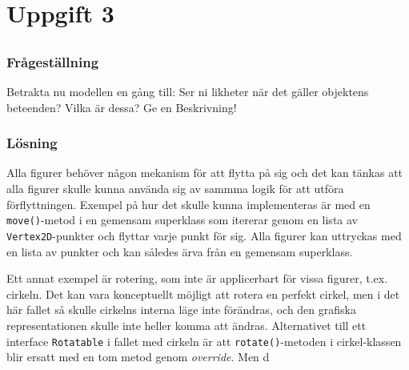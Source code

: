 %
%
%

\section{Uppgift 3}\label{sec:uppg3}

\subsection{}\label{sec:uppg3a}
\subsubsection*{Frågeställning}
Betrakta nu modellen en gång till: Ser ni likheter när det gäller objektens
beteenden? Vilka är dessa? Ge en Beskrivning!

\subsubsection*{Lösning}
Alla figurer behöver någon mekanism för att flytta på sig och det kan tänkas
att alla figurer skulle kunna använda sig av sammma logik för att utföra
förflyttningen. Exempel på hur det skulle kunna implementeras är med en
\texttt{move()}-metod i en gemensam superklass som itererar genom en lista av
\texttt{Vertex2D}-punkter och flyttar varje punkt för sig. Alla figurer kan
uttryckas med en lista av punkter och kan således ärva från en gemensam
superklass.
\par Ett annat exempel är rotering, som inte är applicerbart för vissa figurer,
t.ex. cirkeln. Det kan vara konceptuellt möjligt att rotera en perfekt cirkel,
men i det här fallet så skulle cirkelns interna läge inte förändras, och
den grafiska representationen skulle inte heller komma att ändras.
Alternativet till ett interface \texttt{Rotatable} i fallet med cirkeln är att
\texttt{rotate()}-metoden i cirkel-klassen blir ersatt med en tom metod genom 
\emph{override}. Men d


